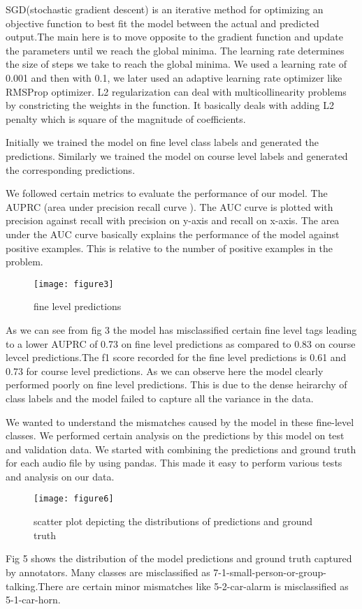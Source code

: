     SGD(stochastic gradient descent) is an iterative method for optimizing an objective function to best fit the model between the actual and predicted output.The main here is to move opposite to the gradient function and update the parameters until we reach the global minima. The learning rate determines the size of steps we take to reach the global minima. We used a learning rate of 0.001 and then with 0.1, we later used an adaptive learning rate optimizer like RMSProp optimizer.
    L2 regularization can deal with multicollinearity problems by constricting the weights in the function. It basically deals with adding L2 penalty which is square of the magnitude of coefficients.
    
    Initially we trained the model on fine level class labels and generated the predictions. Similarly we trained the model on course level labels and generated the corresponding predictions. 
    
    We followed certain metrics to evaluate the performance of our model. The AUPRC (area under precision recall curve ). The AUC curve is plotted with precision against recall with precision on y-axis and recall on x-axis. The area under the AUC curve basically explains the performance of the model against positive examples. This is relative to the number of positive examples in the problem.
    	\begin{figure}[h!]
    	\texttt{[image: figure3]}
    	\caption{fine level predictions}
    \end{figure}
   
    
    As we can see from fig 3 the model has misclassified certain fine level tags leading to a lower AUPRC of 0.73 on fine level predictions as compared to 0.83 on course levcel predictions.The f1 score recorded for the fine level predictions is 0.61 and 0.73 for course level predictions. As we can observe here the model clearly performed poorly on fine level predictions. This is due to the dense heirarchy of class labels and the model failed to capture all the variance in the data.
    
    We wanted to understand the mismatches caused by the model in these fine-level classes. We performed certain analysis on the predictions by this model on test and validation data. We started with combining the predictions and ground truth for each audio file by using pandas. This made it easy to perform various tests and analysis on our data.
    
        	\begin{figure}[h!]
    	\texttt{[image: figure6]}
    	\caption{scatter plot depicting the distributions of predictions and ground truth}
    \end{figure}
    
    Fig 5 shows the distribution of the model predictions and ground truth captured by annotators. Many classes are misclassified as 7-1-small-person-or-group-talking.There are certain minor mismatches like 5-2-car-alarm is misclassified as 5-1-car-horn. 

	
	
